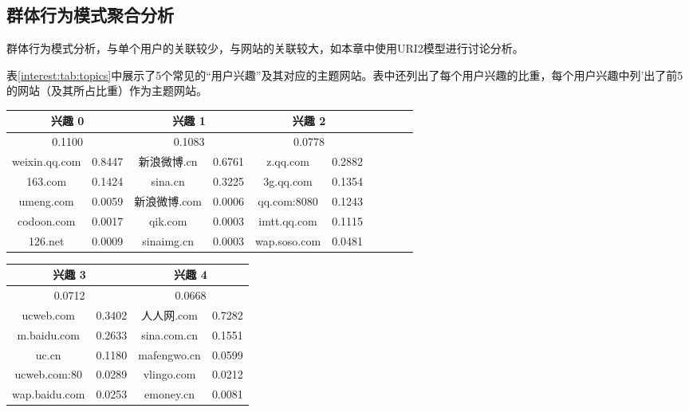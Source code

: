 \subsection{群体行为模式聚合分析}
群体行为模式分析，与单个用户的关联较少，与网站的关联较大，如本章中使用URI2模型进行讨论分析。

表\ref{interest:tab:topics}中展示了5个常见的``用户兴趣''及其对应的主题网站。表中还列出了每个用户兴趣的比重，每个用户兴趣中列'出了前5的网站（及其所占比重）作为主题网站。
\begin{table*}
\centering
\caption{URI2模型中的隐含 用户兴趣 层示例}
\label{interest:tab:topics}
\begin{tabular}{|c|r|c|r|c|r|c|r|c|r|} \hline
 \multicolumn{2}{|c|}{兴趣 0} & \multicolumn{2}{|c|}{兴趣 1} & \multicolumn{2}{|c|}{兴趣 2}  \\ \hline
 \multicolumn{2}{|c|}{0.1100} & \multicolumn{2}{|c|}{0.1083} & \multicolumn{2}{|c|}{0.0778}  \\ \hline
weixin.qq.com & 0.8447 & 新浪微博.cn & 0.6761 & z.qq.com & 0.2882\\ \hline
163.com & 0.1424 & sina.cn & 0.3225 & 3g.qq.com & 0.1354 \\ \hline
umeng.com & 0.0059 & 新浪微博.com & 0.0006 & qq.com:8080 & 0.1243\\ \hline
codoon.com & 0.0017 & qik.com & 0.0003 & imtt.qq.com & 0.1115\\ \hline
126.net & 0.0009 & sinaimg.cn & 0.0003 & wap.soso.com & 0.0481\\ \hline

\hline\end{tabular}
\begin{tabular}{|c|r|c|r|} \hline
 \multicolumn{2}{|c|}{兴趣 3} & \multicolumn{2}{|c|}{兴趣 4} \\ \hline
 \multicolumn{2}{|c|}{0.0712} & \multicolumn{2}{|c|}{0.0668} \\ \hline
ucweb.com & 0.3402 & 人人网.com & 0.7282\\ \hline
m.baidu.com & 0.2633 & sina.com.cn & 0.1551\\ \hline
uc.cn & 0.1180 & mafengwo.cn & 0.0599\\ \hline
ucweb.com:80 & 0.0289 & vlingo.com & 0.0212\\ \hline
wap.baidu.com & 0.0253 & emoney.cn & 0.0081\\ \hline

\hline\end{tabular}
\end{table*}

